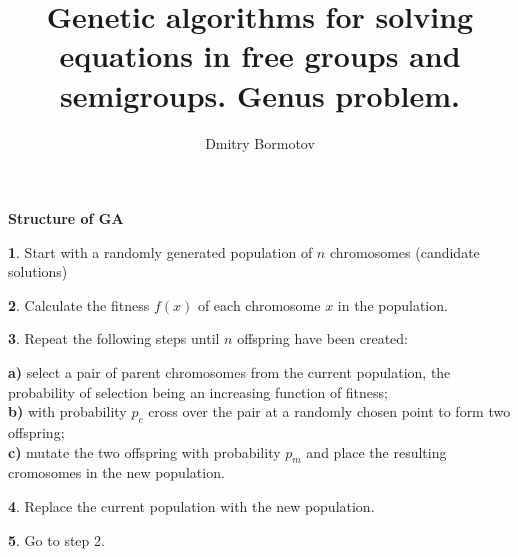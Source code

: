 \documentclass[12pt]{slides}
\title{Genetic algorithms for solving
equations in free groups and semigroups.  Genus problem.}
\author{Dmitry Bormotov} \date{}
\begin{document}
\pagestyle{empty}

\begin{center} \Large\textbf{Structure of GA} \end{center}

{\bf 1}. Start with a randomly generated population of $n$ chromosomes
  (candidate solutions) 

{\bf 2}. Calculate the fitness $f(x)$ of each chromosome $x$ in the population. 

{\bf 3}. Repeat the following steps until $n$ offspring have been created:

{\bf a)} select a pair of parent chromosomes from the current population,
the probability of selection being an increasing function of fitness;\\
{\bf b)} with probability $p_c$ cross over the pair at a randomly chosen
point to form two offspring;\\
{\bf c)} mutate the two offspring with probability $p_m$ and place the
resulting cromosomes in the new population.

{\bf 4}. Replace the current population with the new population.

{\bf 5}. Go to step 2.
\end{document}
